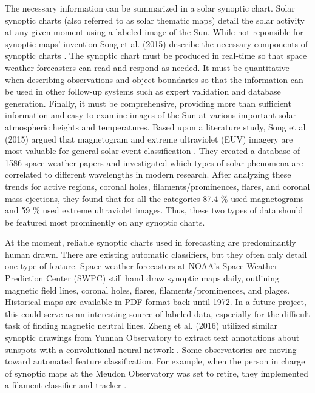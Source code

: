 \documentclass[twoside]{report}
\begin{document}
The necessary information can be summarized in a solar synoptic chart. Solar synoptic charts (also referred to as solar thematic maps) detail the solar activity at any given moment using a labeled image of the Sun. While not reponsible for synoptic maps' invention Song et al. (2015)  describe the necessary components of synoptic charts \cite{song:2015}. The synoptic chart must be produced in real-time so that space weather forecasters can read and respond as needed. It must be quantitative when describing observations and object boundaries so that the information can be used in other follow-up systems such as expert validation and database generation. Finally, it must be comprehensive, providing more than sufficient information and easy to examine images of the Sun at various important solar atmospheric heights and temperatures. Based upon a literature study, Song et al. (2015) argued that magnetogram and extreme ultraviolet (EUV) imagery are most valuable for general solar event classification \cite{song:2015}. They created a database of 1586 space weather papers and investigated which types of solar phenomena are correlated to different wavelengths in modern research. After analyzing these trends for active regions, coronal holes, filaments/prominences, flares, and coronal mass ejections, they found that for all the categories 87.4 \% used magnetograms and 59 \% used extreme ultraviolet images. Thus, these two types of data should be featured most prominently on any synoptic charts.

At the moment, reliable synoptic charts used in forecasting are predominantly human drawn. There are existing automatic classifiers, but they often only detail one type of feature. Space weather forecasters at NOAA's Space Weather Prediction Center (SWPC) still hand draw synoptic maps daily, outlining magnetic field lines, coronal holes, flares, filaments/prominences, and plages. Historical maps are \href{http://www.swpc.noaa.gov/products/solar-synoptic-map}{available in PDF format} back until 1972. In a future project, this could serve as an interesting source of labeled data, especially for the difficult task of finding magnetic neutral lines. Zheng et al. (2016) utilized similar synoptic drawings from Yunnan Observatory to extract text annotations about sunspots with a convolutional neural network \cite{zheng:2016}. Some observatories are moving toward automated feature classification. For example, when the person in charge of synoptic maps at the Meudon Observatory was set to retire, they implemented a filament classifier and tracker \cite{meudon:2007}. 
\end{document}

